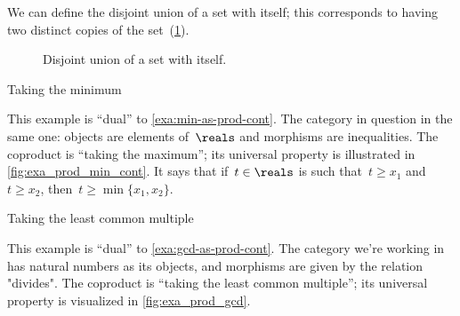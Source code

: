 We can define the disjoint union of a set with itself; this corresponds to having two distinct copies of the set~(\cref{fig:disjointself}).

\begin{figure}[h!]
	\centering
	\caption{Disjoint union of a set with itself.}
	\label{fig:disjointself}
\end{figure}

\begin{marginfigure}
	\centering
	\caption{Taking the minimum}
	\label{fig:exa_coprod_max_cont}
\end{marginfigure}
\begin{example}
	\label{exa:min-as-prod-cont-to-rename}
	This example is ``dual'' to \cref{exa:min-as-prod-cont}.
	The category in question in the same one: objects are elements of~$\reals$ and morphisms are inequalities.
	The coproduct is ``taking the maximum''; its universal property is illustrated in \cref{fig:exa_prod_min_cont}.
	It says that if~$t \in \reals$ is such that~$t \geq x_1$ and $t \geq x_2$, then~$t \geq \min \{ x_1, x_2 \}$.

\end{example}

\begin{marginfigure}
	\centering
	\caption{Taking the least common multiple}
	\label{fig:exa_coprod_lcm_cont}
\end{marginfigure}
\begin{example}
	\label{exa:lcm-as-coprod-cont}
	This example is ``dual'' to \cref{exa:gcd-as-prod-cont}.
	The category we're working in has natural numbers as its objects, and morphisms are given by the relation "divides".
	The coproduct is ``taking the least common multiple''; its universal property is visualized in \cref{fig:exa_prod_gcd}.
\end{example}

